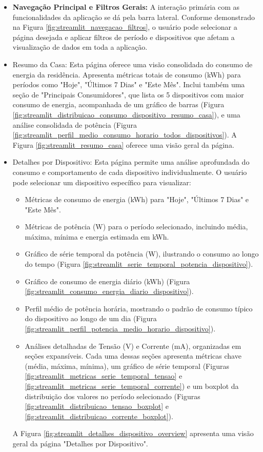 \begin{itemize}
    \item \textbf{Navegação Principal e Filtros Gerais:} A interação primária com as funcionalidades da aplicação se dá pela barra lateral. Conforme demonstrado na Figura \ref{fig:streamlit_navegacao_filtros}, o usuário pode selecionar a página desejada e aplicar filtros de período e dispositivos que afetam a visualização de dados em toda a aplicação.
    
    \item Resumo da Casa: Esta página oferece uma visão consolidada do consumo de energia da residência. Apresenta métricas totais de consumo (kWh) para períodos como "Hoje", "Últimos 7 Dias" e "Este Mês". Inclui também uma seção de "Principais Consumidores", que lista os 5 dispositivos com maior consumo de energia, acompanhada de um gráfico de barras (Figura \ref{fig:streamlit_distribuicao_consumo_dispositivo_resumo_casa}), e uma análise consolidada de potência (Figura \ref{fig:streamlit_perfil_medio_consumo_horario_todos_dispositivos}). A Figura \ref{fig:streamlit_resumo_casa} oferece uma visão geral da página.

    \item Detalhes por Dispositivo: Esta página permite uma análise aprofundada do consumo e comportamento de cada dispositivo individualmente. O usuário pode selecionar um dispositivo específico para visualizar:
    \begin{itemize}
        \item Métricas de consumo de energia (kWh) para "Hoje", "Últimos 7 Dias" e "Este Mês".
        \item Métricas de potência (W) para o período selecionado, incluindo média, máxima, mínima e energia estimada em kWh.
        \item Gráfico de série temporal da potência (W), ilustrando o consumo ao longo do tempo (Figura \ref{fig:streamlit_serie_temporal_potencia_dispositivo}).
        \item Gráfico de consumo de energia diário (kWh) (Figura \ref{fig:streamlit_consumo_energia_diario_dispositivo}).
        \item Perfil médio de potência horária, mostrando o padrão de consumo típico do dispositivo ao longo de um dia (Figura \ref{fig:streamlit_perfil_potencia_medio_horario_dispositivo}).
        \item Análises detalhadas de Tensão (V) e Corrente (mA), organizadas em seções expansíveis. Cada uma dessas seções apresenta métricas chave (média, máxima, mínima), um gráfico de série temporal (Figuras \ref{fig:streamlit_metricas_serie_temporal_tensao} e \ref{fig:streamlit_metricas_serie_temporal_corrente}) e um boxplot da distribuição dos valores no período selecionado (Figuras \ref{fig:streamlit_distribuicao_tensao_boxplot} e \ref{fig:streamlit_distribuicao_corrente_boxplot}).
    \end{itemize}
    A Figura \ref{fig:streamlit_detalhes_dispositivo_overview} apresenta uma visão geral da página "Detalhes por Dispositivo".


\end{itemize}
